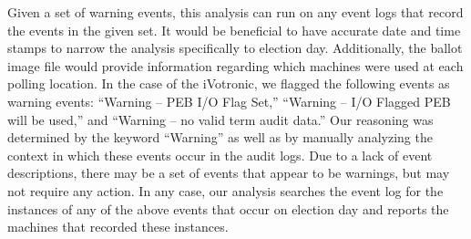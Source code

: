 Given a set of warning events, this analysis can run on any event logs that record the events in the given set. It would be beneficial to have accurate date and time stamps to narrow the analysis specifically to election day. Additionally, the ballot image file would provide information regarding which machines were used at each polling location.  In the case of the iVotronic, we flagged the following events as warning events: \textquotedblleft Warning -- PEB I/O Flag Set,\textquotedblright \hspace{1 mm} \textquotedblleft Warning -- I/O Flagged PEB will be used,\textquotedblright \hspace{1 mm} and \textquotedblleft Warning -- no valid term audit data.\textquotedblright \hspace{2 mm} Our reasoning was determined by the keyword \textquotedblleft Warning\textquotedblright \hspace{1 mm} as well as by manually analyzing the context in which these events occur in the audit logs. Due to a lack of event descriptions, there may be a set of events that appear to be warnings, but may not require any action. In any case, our analysis searches the event log for the instances of any of the above events that occur on election day and reports the machines that recorded these instances. 
